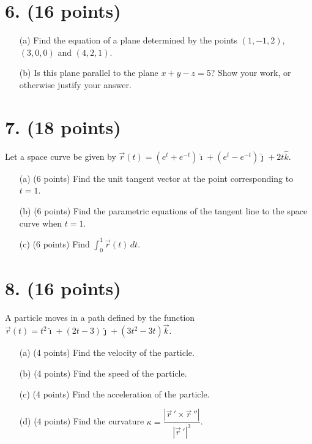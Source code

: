 \documentclass[12pt]{article}
\begin{document}
\section*{6. (16 points)}

\begin{itemize}
    \item[(a)] Find the equation of a plane determined by the points $(1, -1, 2)$, $(3, 0, 0)$ and $(4, 2, 1)$.
    \item[(b)] Is this plane parallel to the plane $x + y - z = 5$? Show your work, or otherwise justify your answer.
\end{itemize}

\newpage

\section*{7. (18 points)}

Let a space curve be given by $\vec{r}(t) = (e^t + e^{-t})\hat{\imath} + (e^t - e^{-t})\hat{\jmath} + 2t\hat{k}$.

\begin{itemize}
    \item[(a)] (6 points) Find the unit tangent vector at the point corresponding to $t = 1$.
    \item[(b)] (6 points) Find the parametric equations of the tangent line to the space curve when $t = 1$.
    \item[(c)] (6 points) Find $\displaystyle \int_0^1 \vec{r}(t)\, dt$.
\end{itemize}

\newpage

\section*{8. (16 points)}

A particle moves in a path defined by the function $\vec{r}(t) = t^2 \hat{\imath} + (2t - 3) \hat{\jmath} + (3t^2 - 3t) \vec{k}$.

\begin{itemize}
    \item[(a)] (4 points) Find the velocity of the particle.
    \item[(b)] (4 points) Find the speed of the particle.
    \item[(c)] (4 points) Find the acceleration of the particle.
    \item[(d)] (4 points) Find the curvature $\kappa = \dfrac{|\vec{r}\,' \times \vec{r}\,''|}{|\vec{r}\,'|^3}$.
\end{itemize}
\end{document}
